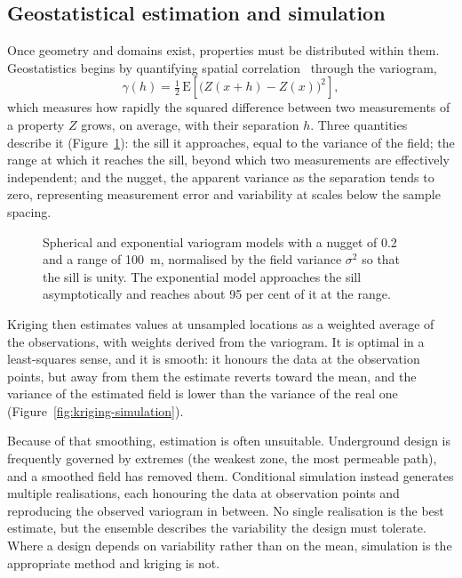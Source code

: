 \subsection{Geostatistical estimation and simulation}
\label{sec:geostatistics}

Once geometry and domains exist, properties must be distributed within them. Geostatistics
begins by quantifying spatial
correlation~\citep{baecher2003reliability,phoon1999characterization} through
the variogram,
\[
\gamma(h) = \tfrac{1}{2}\,\mathrm{E}\!\left[\bigl(Z(x+h)-Z(x)\bigr)^{2}\right],
\]
which measures how rapidly the squared difference between two measurements
of a property $Z$ grows, on average, with their separation $h$. Three
quantities describe it (Figure~\ref{fig:variogram-model}): the sill it approaches, equal to the variance of the
field; the range at which it reaches the sill, beyond which two measurements
are effectively independent; and the nugget, the apparent variance as the
separation tends to zero, representing measurement error and variability at
scales below the sample spacing.

\begin{figure}[htbp]
\centering
{}
\caption{Spherical and exponential variogram models with a nugget of 0.2 and a range of 100~m, normalised by the field variance $\sigma^2$ so that the sill is unity. The exponential model approaches the sill asymptotically and reaches about 95 per cent of it at the range.}
\label{fig:variogram-model}
\end{figure}

Kriging then estimates values at unsampled locations as a weighted average of
the observations, with weights derived from the variogram. It is optimal in a
least-squares sense, and it is smooth: it honours the data at the observation
points, but away from them the estimate reverts toward the mean, and the
variance of the estimated field is lower than the variance of the real one
(Figure~\ref{fig:kriging-simulation}).

Because of that smoothing, estimation is often unsuitable.
Underground design is frequently governed by extremes (the weakest zone,
the most permeable path), and a smoothed field has removed them.
Conditional simulation instead generates multiple realisations, each honouring
the data at observation points and reproducing the observed variogram in
between. No single realisation is the best estimate, but the ensemble
describes the variability the design must tolerate. Where a design depends on
variability rather than on the mean, simulation is the appropriate method and
kriging is not.

